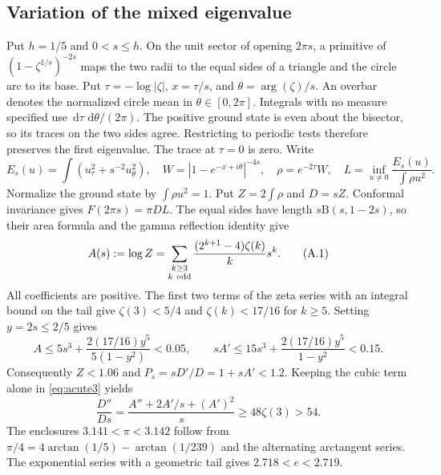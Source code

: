 \documentclass[11pt,a4paper,reqno]{amsart}
\theoremstyle{remark}
\numberwithin{equation}{section}
\newcommand{\dd}{\,\mathrm d}
\begin{document}
\subsection{Variation of the mixed eigenvalue}
Put $h=1/5$ and $0<s\le h$. On the unit sector of opening $2\pi s$, a
primitive of $(1-\zeta^{1/s})^{-2s}$ maps the two radii to the equal sides
of a triangle and the circle arc to its base. Put
$\tau=-\log|\zeta|$, $x=\tau/s$, and $\theta=\arg(\zeta)/s$. An overbar
denotes the normalized circle mean in $\theta\in[0,2\pi]$. Integrals with
no measure specified use $\dd\tau\,\dd\theta/(2\pi)$. The positive ground
state is even about the bisector, so its traces on the two sides agree.
Restricting to periodic tests therefore preserves the first eigenvalue.
The trace at $\tau=0$ is zero. Write
\[
 E_s(u)=\int(u_\tau^2+s^{-2}u_\theta^2),\quad
 W=|1-e^{-x+i\theta}|^{-4s},\quad \rho=e^{-2\tau}W,\quad
 L=\inf_{u\ne0}\frac{E_s(u)}{\int\rho u^2}.
\]
Normalize the ground state by $\int\rho u^2=1$. Put $Z=2\int\rho$ and
$D=sZ$. Conformal invariance gives $F(2\pi s)=\pi DL$. The equal sides
have length $s\mathrm B(s,1-2s)$, so their area formula and the gamma
reflection identity give
\[
 A(s):=\log Z=\sum_{\substack{k\ge3\\k\ {\rm odd}}}
       \frac{(2^{k+1}-4)\zeta(k)}{k}s^k .
 \tag{A.1}\label{eq:acute3}
\]
All coefficients are positive. The first two terms of the zeta series with
an integral bound on the tail give $\zeta(3)<5/4$ and $\zeta(k)<17/16$ for
$k\ge5$. Setting $y=2s\le2/5$ gives
\[
 A\le5s^3+\frac{2(17/16)y^5}{5(1-y^2)}<0.05,\qquad
 sA'\le15s^3+\frac{2(17/16)y^5}{1-y^2}<0.15 .
\]
Consequently $Z<1.06$ and $P_s=sD'/D=1+sA'<1.2$. Keeping the cubic
term alone in \eqref{eq:acute3} yields
\[
 \frac{D''}{Ds}=\frac{A''+2A'/s+(A')^2}{s}
 \ge48\zeta(3)>54.
 \tag{A.2}\label{eq:acute4}
\]
The enclosures $3.141<\pi<3.142$ follow from
$\pi/4=4\arctan(1/5)-\arctan(1/239)$ and the alternating arctangent
series. The exponential series with a geometric tail gives $2.718<e<2.719$.
\end{document}
